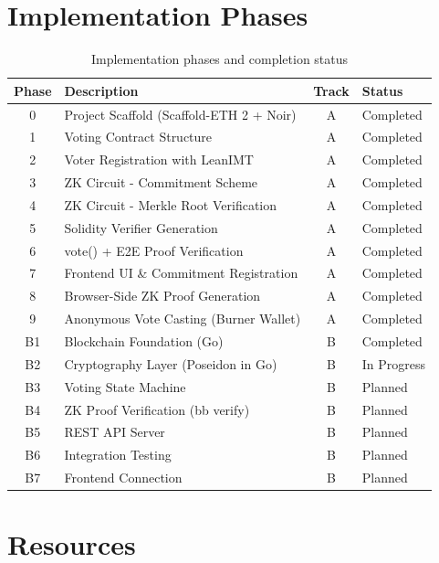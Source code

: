 \documentclass[12pt, a4paper]{report}
\begin{document}
\section{Implementation Phases}

\begin{table}[H]
\centering
\caption{Implementation phases and completion status}
\label{tab:phases}
\begin{tabular}{|c|l|c|l|}
\hline
\textbf{Phase} & \textbf{Description} & \textbf{Track} & \textbf{Status} \\ \hline
0 & Project Scaffold (Scaffold-ETH 2 + Noir) & A & Completed \\ \hline
1 & Voting Contract Structure & A & Completed \\ \hline
2 & Voter Registration with LeanIMT & A & Completed \\ \hline
3 & ZK Circuit - Commitment Scheme & A & Completed \\ \hline
4 & ZK Circuit - Merkle Root Verification & A & Completed \\ \hline
5 & Solidity Verifier Generation & A & Completed \\ \hline
6 & vote() + E2E Proof Verification & A & Completed \\ \hline
7 & Frontend UI \& Commitment Registration & A & Completed \\ \hline
8 & Browser-Side ZK Proof Generation & A & Completed \\ \hline
9 & Anonymous Vote Casting (Burner Wallet) & A & Completed \\ \hline
\hline
B1 & Blockchain Foundation (Go) & B & Completed \\ \hline
B2 & Cryptography Layer (Poseidon in Go) & B & In Progress \\ \hline
B3 & Voting State Machine & B & Planned \\ \hline
B4 & ZK Proof Verification (bb verify) & B & Planned \\ \hline
B5 & REST API Server & B & Planned \\ \hline
B6 & Integration Testing & B & Planned \\ \hline
B7 & Frontend Connection & B & Planned \\ \hline
\end{tabular}
\end{table}

\section{Resources}
\end{document}
